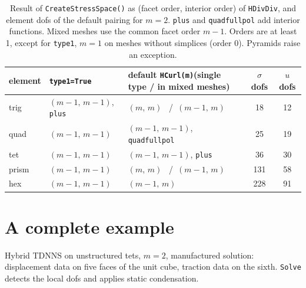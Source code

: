 \documentclass[10pt,a4paper]{article}
\newcommand{\code}[1]{\texttt{#1}}
\begin{document}
\begin{table}[h]\centering\small
\begin{tabular}{@{}lllcc@{}}\toprule
 element & \code{type1=True} & default \code{HCurl(m)}\quad (single type / in mixed meshes) & $\sigma$ dofs & $u$ dofs\\\midrule
 trig  & $(m{-}1,\,m{-}1)$, \code{plus} & $(m,\,m)$ \ /\ $(m{-}1,\,m)$ & 18 & 12\\
 quad  & $(m{-}1,\,m{-}1)$ & $(m{-}1,\,m{-}1)$, \code{quadfullpol} & 25 & 19\\
 tet   & $(m{-}1,\,m{-}1)$ & $(m{-}1,\,m{-}1)$, \code{plus} & 36 & 30\\
 prism & $(m{-}1,\,m{-}1)$ & $(m,\,m)$ \ /\ $(m{-}1,\,m)$ & 131 & 58\\
 hex   & $(m{-}1,\,m{-}1)$ & $(m{-}1,\,m)$ & 228 & 91\\\bottomrule
\end{tabular}
\caption{Result of \code{CreateStressSpace()} as (facet order, interior order) of \code{HDivDiv}, and element dofs of the default pairing for $m=2$. \code{plus} and \code{quadfullpol} add interior functions. Mixed meshes use the common facet order $m-1$. Orders are at least 1, except for \code{type1}, $m=1$ on meshes without simplices (order 0). Pyramids raise an exception.}\label{tab:rules}
\end{table}

\section{A complete example}

Hybrid TDNNS on unstructured tets, $m=2$, manufactured solution: displacement data on five faces of the unit cube, traction data on the sixth. \code{Solve} detects the local dofs and applies static condensation.
\end{document}
